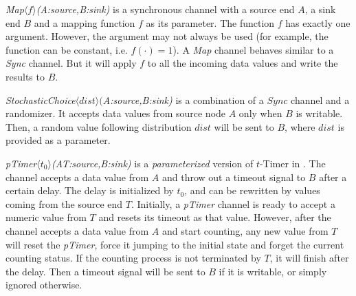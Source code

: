 \begin{description}
    \item \emph{Map$\langle f\rangle$(A:source,B:sink)}
        is a synchronous channel with a source end $A$, a sink end $B$ and a mapping function $f$ as its parameter. The function $f$ has exactly one argument. However, the argument may not always be used (for example, the function can be constant, i.e. $f(\cdot)=1$).
        A \emph{Map} channel behaves similar to a \emph{Sync} channel. But it will apply $f$ to all the incoming data values and write the results to $B$.
    \item \emph{StochasticChoice$\langle dist\rangle($A:source,B:sink)} is a combination of a $Sync$ channel and a randomizer.
        It accepts data values from source node $A$ only when $B$ is writable. Then, a random value following distribution $dist$ will be sent to $B$, where $dist$ is provided as a parameter.
    \item \emph{pTimer$\langle t_0\rangle$(A\:T:source,B:sink)} is a \emph{parameterized} version of $t$-Timer in \cite{Meng2012}. 
        The channel accepts a data value from $A$ and throw out a timeout signal to $B$ after a certain delay. The delay is initialized by $t_0$, and can be rewritten by values coming from the source end $T$. Initially, a \emph{pTimer} channel is ready to accept a numeric value from $T$ and resets its timeout as that value. However, after the channel accepts a data value from $A$ and start counting, any new value from $T$ will reset the \emph{pTimer}, force it jumping to the initial state and forget the current counting status. If the counting process is not terminated by $T$, it will finish after the delay. Then a timeout signal will be sent to $B$ if it is writable, or simply ignored otherwise.

\end{description}


